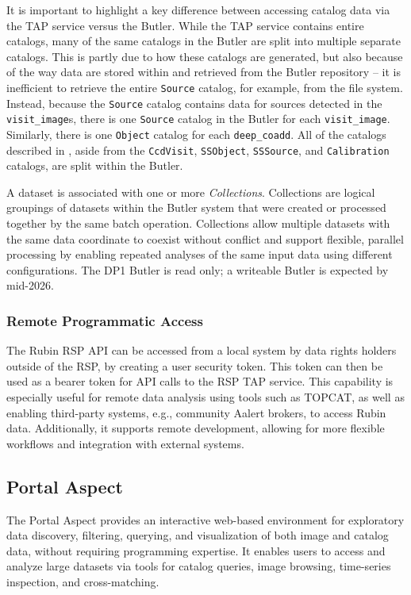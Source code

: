 It is important to highlight a key difference between accessing catalog data via the \gls{TAP} service versus the Butler.
While the \gls{TAP} service contains entire catalogs, many of the same catalogs in the Butler are split into multiple separate catalogs.
This is partly due to how these catalogs are generated, but also because of the way data are stored within and retrieved from the Butler repository -- it is inefficient to retrieve the entire \texttt{Source} catalog, for example, from the file system.
Instead, because the \texttt{Source} catalog contains data for sources detected in the \texttt{visit\_image}s, there is one \texttt{Source} catalog in the Butler for each \texttt{visit\_image}. Similarly, there is one \texttt{Object} catalog for each \texttt{deep\_coadd}.
All of the catalogs described in , aside from the \texttt{CcdVisit}, \texttt{SSObject}, \texttt{SSSource}, and \texttt{Calibration} catalogs, are split within the Butler.


A dataset is associated with one or more \emph{Collections}.
Collections are logical groupings of  datasets within the \gls{Butler} system that were created or processed together by the same batch operation.
Collections allow multiple datasets with the same data coordinate to coexist without conflict and support flexible, parallel processing by enabling repeated analyses of the same input data using different configurations.
The \gls{DP1} Butler is read only; a writeable Butler is expected by mid-2026.

\subsubsection{Remote Programmatic Access}
\label{sssec:remote_api}
The Rubin \gls{RSP} \gls{API} can be accessed from a local system by data rights holders outside of the \gls{RSP}, by creating a user security token. 
This token can then be used as a bearer token for \gls{API} calls to the \gls{RSP} TAP service.
This capability is especially useful for remote data analysis using tools such as \gls{TOPCAT}, as well as enabling third-party systems, e.g., community Aalert brokers, to access Rubin data.
Additionally, it supports remote development, allowing for more flexible workflows and integration with external systems.

\subsection{Portal Aspect}
\label{ssec:rsp_portal}
The Portal Aspect provides an interactive web-based environment for exploratory data discovery, filtering, querying, and visualization of both image and catalog data, without requiring programming expertise.
It enables users to access and analyze large datasets via tools for catalog queries, image browsing, time-series inspection, and cross-matching.

